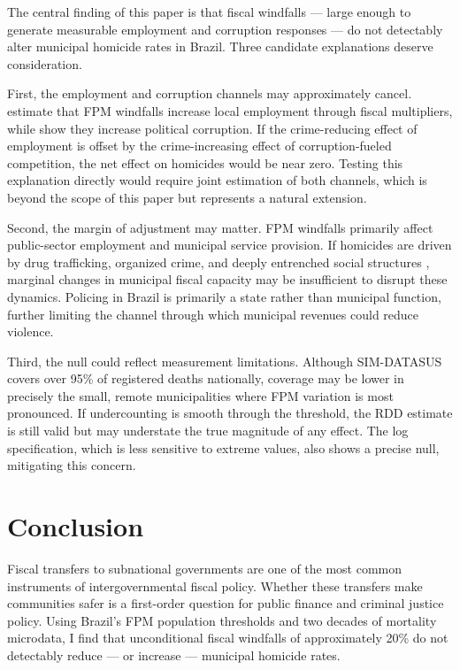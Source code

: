 \documentclass[12pt]{article}
\begin{document}
The central finding of this paper is that fiscal windfalls --- large enough to generate measurable employment and corruption responses --- do not detectably alter municipal homicide rates in Brazil. Three candidate explanations deserve consideration.

First, the employment and corruption channels may approximately cancel. \citet{corbi2019fiscal} estimate that FPM windfalls increase local employment through fiscal multipliers, while \citet{brollo2013political} show they increase political corruption. If the crime-reducing effect of employment is offset by the crime-increasing effect of corruption-fueled competition, the net effect on homicides would be near zero. Testing this explanation directly would require joint estimation of both channels, which is beyond the scope of this paper but represents a natural extension.

Second, the margin of adjustment may matter. FPM windfalls primarily affect public-sector employment and municipal service provision. If homicides are driven by drug trafficking, organized crime, and deeply entrenched social structures \citep{magaloni2020living}, marginal changes in municipal fiscal capacity may be insufficient to disrupt these dynamics. Policing in Brazil is primarily a state rather than municipal function, further limiting the channel through which municipal revenues could reduce violence.

Third, the null could reflect measurement limitations. Although SIM-DATASUS covers over 95\% of registered deaths nationally, coverage may be lower in precisely the small, remote municipalities where FPM variation is most pronounced. If undercounting is smooth through the threshold, the RDD estimate is still valid but may understate the true magnitude of any effect. The log specification, which is less sensitive to extreme values, also shows a precise null, mitigating this concern.

\section{Conclusion}

Fiscal transfers to subnational governments are one of the most common instruments of intergovernmental fiscal policy. Whether these transfers make communities safer is a first-order question for public finance and criminal justice policy. Using Brazil's FPM population thresholds and two decades of mortality microdata, I find that unconditional fiscal windfalls of approximately 20\% do not detectably reduce --- or increase --- municipal homicide rates.
\end{document}
